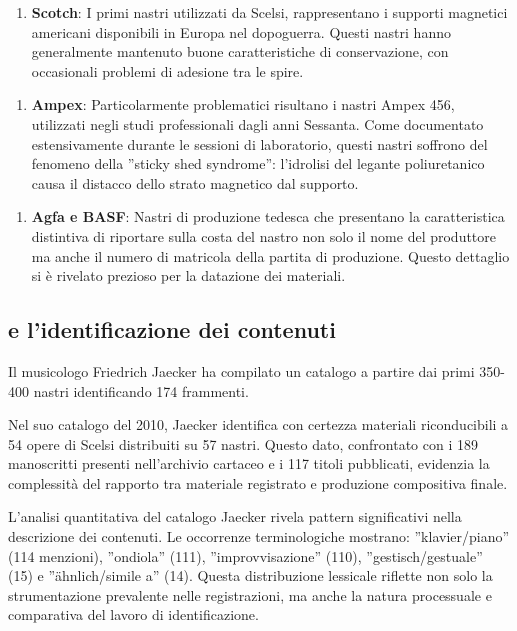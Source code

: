 \begin{enumerate}
    \item \textbf{Scotch}: I primi nastri utilizzati da Scelsi, rappresentano i supporti magnetici americani disponibili in Europa nel dopoguerra. Questi nastri hanno generalmente mantenuto buone caratteristiche di conservazione, con occasionali problemi di adesione tra le spire.
\end{enumerate}

\begin{enumerate}
    \item \textbf{Ampex}: Particolarmente problematici risultano i nastri Ampex 456, utilizzati negli studi professionali dagli anni Sessanta. Come documentato estensivamente durante le sessioni di laboratorio, questi nastri soffrono del fenomeno della ''sticky shed syndrome'': l'idrolisi del legante poliuretanico causa il distacco dello strato magnetico dal supporto.
\end{enumerate}

\begin{enumerate}
    \item \textbf{Agfa e BASF}: Nastri di produzione tedesca che presentano la caratteristica distintiva di riportare sulla costa del nastro non solo il nome del produttore ma anche il numero di matricola della partita di produzione. Questo dettaglio si è rivelato prezioso per la datazione dei materiali.
\end{enumerate}
\subsection{ e l'identificazione dei contenuti}
Il musicologo Friedrich Jaecker ha compilato un catalogo a partire dai primi 350-400 nastri identificando 174 frammenti.

Nel suo catalogo del 2010, Jaecker identifica con certezza materiali riconducibili a 54 opere di Scelsi distribuiti su 57 nastri. Questo dato, confrontato con i 189 manoscritti presenti nell'archivio cartaceo e i 117 titoli pubblicati, evidenzia la complessità del rapporto tra materiale registrato e produzione compositiva finale\cite[p. 47]{Bernardini2020Quanti}.

L'analisi quantitativa del catalogo Jaecker rivela pattern significativi nella descrizione dei contenuti. Le occorrenze terminologiche mostrano: ''klavier/piano'' (114 menzioni), ''ondiola'' (111), ''improvvisazione'' (110), ''gestisch/gestuale'' (15) e ''ähnlich/simile a'' (14)\cite[p. 48]{Bernardini2020Quanti}. Questa distribuzione lessicale riflette non solo la strumentazione prevalente nelle registrazioni, ma anche la natura processuale e comparativa del lavoro di identificazione.
